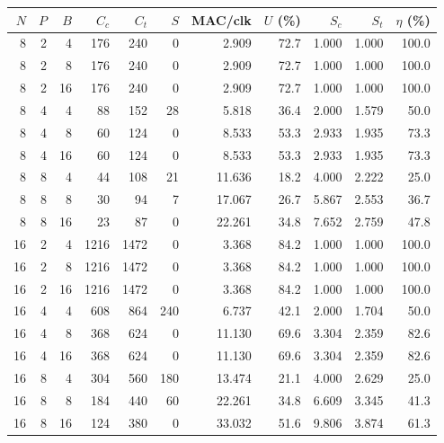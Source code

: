 \begin{tabular}{rrrrrrrrrrr}
\toprule
$N$ & $P$ & $B$ & $C_c$ & $C_t$ & $S$ & MAC/clk & $U$ (\%) & $S_c$ & $S_t$ & $\eta$ (\%)\\
\midrule
8 & 2 & 4 & 176 & 240 & 0 & 2.909 & 72.7 & 1.000 & 1.000 & 100.0\\
8 & 2 & 8 & 176 & 240 & 0 & 2.909 & 72.7 & 1.000 & 1.000 & 100.0\\
8 & 2 & 16 & 176 & 240 & 0 & 2.909 & 72.7 & 1.000 & 1.000 & 100.0\\
8 & 4 & 4 & 88 & 152 & 28 & 5.818 & 36.4 & 2.000 & 1.579 & 50.0\\
8 & 4 & 8 & 60 & 124 & 0 & 8.533 & 53.3 & 2.933 & 1.935 & 73.3\\
8 & 4 & 16 & 60 & 124 & 0 & 8.533 & 53.3 & 2.933 & 1.935 & 73.3\\
8 & 8 & 4 & 44 & 108 & 21 & 11.636 & 18.2 & 4.000 & 2.222 & 25.0\\
8 & 8 & 8 & 30 & 94 & 7 & 17.067 & 26.7 & 5.867 & 2.553 & 36.7\\
8 & 8 & 16 & 23 & 87 & 0 & 22.261 & 34.8 & 7.652 & 2.759 & 47.8\\
16 & 2 & 4 & 1216 & 1472 & 0 & 3.368 & 84.2 & 1.000 & 1.000 & 100.0\\
16 & 2 & 8 & 1216 & 1472 & 0 & 3.368 & 84.2 & 1.000 & 1.000 & 100.0\\
16 & 2 & 16 & 1216 & 1472 & 0 & 3.368 & 84.2 & 1.000 & 1.000 & 100.0\\
16 & 4 & 4 & 608 & 864 & 240 & 6.737 & 42.1 & 2.000 & 1.704 & 50.0\\
16 & 4 & 8 & 368 & 624 & 0 & 11.130 & 69.6 & 3.304 & 2.359 & 82.6\\
16 & 4 & 16 & 368 & 624 & 0 & 11.130 & 69.6 & 3.304 & 2.359 & 82.6\\
16 & 8 & 4 & 304 & 560 & 180 & 13.474 & 21.1 & 4.000 & 2.629 & 25.0\\
16 & 8 & 8 & 184 & 440 & 60 & 22.261 & 34.8 & 6.609 & 3.345 & 41.3\\
16 & 8 & 16 & 124 & 380 & 0 & 33.032 & 51.6 & 9.806 & 3.874 & 61.3\\
\bottomrule
\end{tabular}
